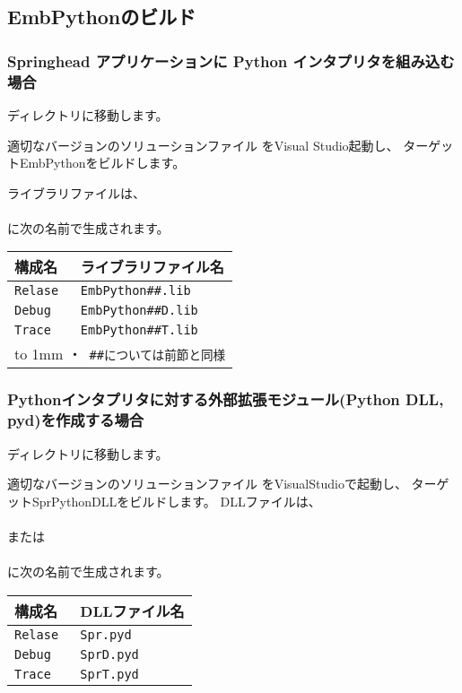 \subsection{EmbPythonのビルド}
\label{subsec:EmbPython_Build}
\parindent=0pt

\subsubsection{Springhead アプリケーションに Python インタプリタを組み込む場合}

\medskip
ディレクトリ\SprTop{\core\src\EmbPython}に移動します。
\label{subsubsec:EmbPythonInterpreter}

\medskip
適切なバージョンのソリューションファイル
をVisual Studio起動し、
ターゲットEmbPythonをビルドします。

ライブラリファイルは、\\
\hspace{20pt}\\
に次の名前で生成されます。

\begin{center}
\begin{tabular}{l@{\ \ ---\ \ }l}\hline
	構成名 & ライブラリファイル名 \\\hline
	\tt{Relase} & \tt{EmbPython\#\#.lib}  \\
	\tt{Debug}  & \tt{EmbPython\#\#D.lib} \\
	\tt{Trace}  & \tt{EmbPython\#\#T.lib} \\\hline
	\multicolumn{2}{l}{\footnotesize{\vbox{\vbox to 1mm{}
		\hbox{・ \tt{\#\#}については前節と同様}}}}
\end{tabular}
\end{center}

\bigskip
\subsubsection{Pythonインタプリタに対する外部拡張モジュール(Python DLL, pyd)を作成する場合}
\label{subsubsec:EmbPythonDLL}

\medskip
ディレクトリ\SprTop{\core\embed}に移動します。

適切なバージョンのソリューションファイル
をVisualStudioで起動し、
ターゲットSprPythonDLLをビルドします。
DLLファイルは、\\
\hspace{20pt}\\
または\\
\hspace{20pt}\\
に次の名前で生成されます。

\begin{center}\begin{tabular}{l@{\ \ ---\ \ }l}\hline
	構成名 & DLLファイル名 \\\hline
	\tt{Relase} & \tt{Spr.pyd}  \\
	\tt{Debug}  & \tt{SprD.pyd} \\
	\tt{Trace}  & \tt{SprT.pyd} \\\hline
\end{tabular}\end{center}

\bigskip
